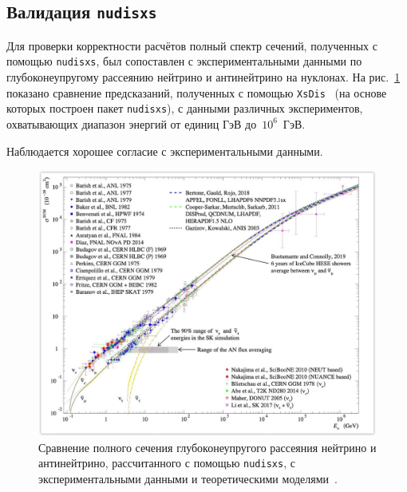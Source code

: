 \subsection{Валидация \texttt{nudisxs}}

Для проверки корректности расчётов полный спектр сечений, полученных с помощью \texttt{nudisxs}, был сопоставлен с экспериментальными данными по глубоконеупругому рассеянию нейтрино и антинейтрино на нуклонах. 
На рис.~\ref{fig:disxs_compare} показано сравнение предсказаний, полученных с помощью \texttt{XsDis}~\cite{kuzmin2006_finetuning,kuzmin2005_sumcc,kuzmin2006_axialmass} (на основе которых построен пакет \texttt{nudisxs}), с данными различных экспериментов, охватывающих диапазон энергий от единиц ГэВ до~$10^6$~ГэВ.

Наблюдается хорошее согласие с экспериментальными данными.

\begin{figure}[!h]
\centering
\includegraphics[width=\linewidth]{images/dis_vs_data.pdf}
\caption{Сравнение полного сечения глубоконеупругого рассеяния нейтрино и антинейтрино, рассчитанного с помощью \texttt{nudisxs}, с экспериментальными данными и теоретическими моделями~\cite{kuzmin2006_finetuning,kuzmin2005_sumcc,kuzmin2006_axialmass}.}
\label{fig:disxs_compare}
\end{figure}

